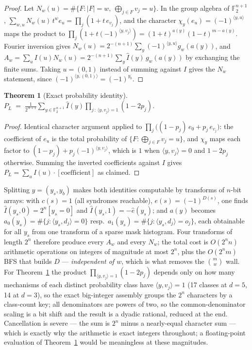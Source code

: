 \documentclass[11pt]{amsart}
\newcommand{\PL}{P_{L}}
\newcommand{\Zt}{\mathbb{F}_2}
\theoremstyle{plain}
\newtheorem{theorem}{Theorem}[section]
\theoremstyle{definition}
\theoremstyle{remark}
\begin{document}
\begin{proof}
Let $N_w(u) = \#\{F : |F| = w,\ \bigoplus_{j \in F} v_j = u\}$. In the group
algebra of $\Zt^{n+1}$, $\sum_{w,u} N_w(u)\, t^w e_u = \prod_j (1 + t\,
e_{v_j})$, and the character $\chi_y(e_u) = (-1)^{\langle y,u\rangle}$ maps
the product to $\prod_j (1 + t(-1)^{\langle y, v_j\rangle}) =
(1+t)^{a(y)} (1-t)^{m - a(y)}$. Fourier inversion gives $N_w(u) =
2^{-(n+1)} \sum_y (-1)^{\langle y,u\rangle} g_w(a(y))$, and $A_w = \sum_u
I(u) N_w(u) = 2^{-(n+1)} \sum_y \widehat{I}(y)\, g_w(a(y))$ by exchanging
the finite sums. Taking $u = (0,1)$ instead of summing against $I$ gives the
$N_w$ statement, since $(-1)^{\langle y, (0,1)\rangle} = (-1)^{y_b}$.
\end{proof}

\begin{theorem}[Exact probability identity]\label{thm:dia}
$\displaystyle \PL \;=\; \frac{1}{2^{\,n+1}} \sum_{y \in \Zt^{n+1}}
\widehat{I}(y) \prod_{j\,:\, \langle y, v_j\rangle = 1} (1 - 2p_j)$.
\end{theorem}

\begin{proof}
Identical character argument applied to $\prod_j \bigl((1-p_j)\,e_0 + p_j\,
e_{v_j}\bigr)$: the coefficient of $e_u$ is the total probability of
$\{F : \bigoplus_{j\in F} v_j = u\}$, and $\chi_y$ maps each factor to
$(1-p_j) + p_j(-1)^{\langle y, v_j\rangle}$, which is $1$ when
$\langle y, v_j \rangle = 0$ and $1 - 2p_j$ otherwise. Summing the inverted
coefficients against $I$ gives $\PL = \sum_u I(u) \cdot [\text{coefficient}]$
as claimed.
\end{proof}

Splitting $y = (y_s, y_b)$ makes both identities computable by transforms of
$n$-bit arrays: with $c(s) = 1$ (all syndromes reachable), $e(s) =
(-1)^{D(s)}$, one finds $\widehat{I}(y_s, 0) = 2^n[y_s = 0]$ and
$\widehat{I}(y_s, 1) = -\widehat{e}(y_s)$; and $a(y)$ becomes $a_0(y_s) =
\#\{j : \langle y_s, d_j\rangle = 0\}$ resp.\ $a_1(y_s) = \#\{j : \langle
y_s, d_j\rangle = o_j\}$, each obtainable for all $y_s$ from one transform of
a sparse mask histogram. Four transforms of length $2^n$ therefore produce
every $A_w$ and every $N_w$; the total cost is $O(2^n n)$ arithmetic
operations on integers of magnitude at most $2^n$, plus the $O(2^n m)$ BFS
that builds $D$ --- \emph{independent of $w$}, which is what removes the
$\binom{m}{w}$ wall. For Theorem~\ref{thm:dia} the product
$\prod_{\langle y, v_j\rangle = 1} (1 - 2p_j)$ depends only on how many
mechanisms of each distinct probability class have $\langle y, v_j \rangle =
1$ (17 classes at $d=5$, 14 at $d=3$), so the exact big-integer assembly
groups the $2^n$ characters by a class-count key; all denominators are
powers of two, so the common-denominator scaling is a bit shift and the
result is a dyadic rational, reduced at the end. Cancellation is severe ---
the sum is $2^n$ minus a nearly-equal character sum --- which is exactly why
the arithmetic is exact integers throughout; a floating-point evaluation of
Theorem~\ref{thm:dia} would be meaningless at these magnitudes.
\end{document}
